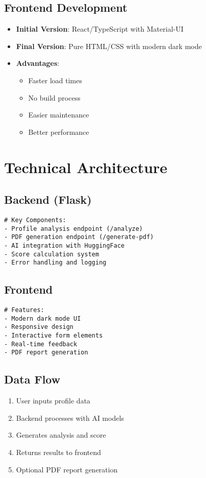 \documentclass[12pt,a4paper]{article}
\begin{document}
\subsection{Frontend Development}
\begin{itemize}
    \item \textbf{Initial Version}: React/TypeScript with Material-UI
    \item \textbf{Final Version}: Pure HTML/CSS with modern dark mode
    \item \textbf{Advantages}:
    \begin{itemize}
        \item Faster load times
        \item No build process
        \item Easier maintenance
        \item Better performance
    \end{itemize}
\end{itemize}

\section{Technical Architecture}

\subsection{Backend (Flask)}
\begin{lstlisting}
# Key Components:
- Profile analysis endpoint (/analyze)
- PDF generation endpoint (/generate-pdf)
- AI integration with HuggingFace
- Score calculation system
- Error handling and logging
\end{lstlisting}

\subsection{Frontend}
\begin{lstlisting}
# Features:
- Modern dark mode UI
- Responsive design
- Interactive form elements
- Real-time feedback
- PDF report generation
\end{lstlisting}

\subsection{Data Flow}
\begin{enumerate}
    \item User inputs profile data
    \item Backend processes with AI models
    \item Generates analysis and score
    \item Returns results to frontend
    \item Optional PDF report generation
\end{enumerate}
\end{document}
